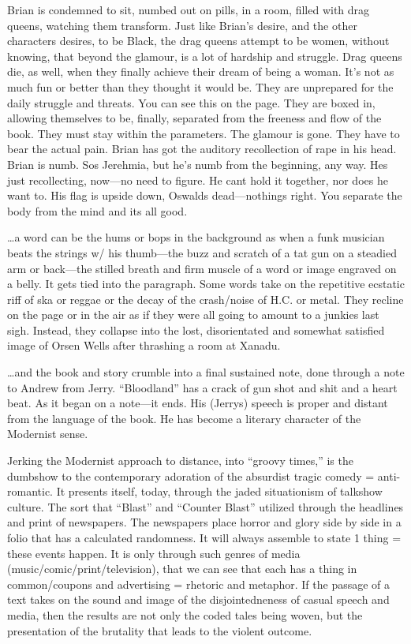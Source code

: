 \documentclass[
]{memoir}
\begin{document}
Brian is condemned to sit, numbed out on pills, in a room, filled with
drag queens, watching them transform. Just like Brian's desire, and the
other characters desires, to be Black, the drag queens attempt to be
women, without knowing, that beyond the glamour, is a lot of hardship
and struggle. Drag queens die, as well, when they finally achieve their
dream of being a woman. It's not as much fun or better than they thought
it would be. They are unprepared for the daily struggle and threats. You
can see this on the page. They are boxed in, allowing themselves to be,
finally, separated from the freeness and flow of the book. They must
stay within the parameters. The glamour is gone. They have to bear the
actual pain. Brian has got the auditory recollection of rape in his
head. Brian is numb. Sos Jerehmia, but he's numb from the beginning, any
way. Hes just recollecting, now---no need to figure. He cant hold it
together, nor does he want to. His flag is upside down, Oswalds
dead---nothings right. You separate the body from the mind and its all
good.

\ldots{}a word can be the hums or bops in the background as when a funk
musician beats the strings w/ his thumb---the buzz and scratch of a tat
gun on a steadied arm or back---the stilled breath and firm muscle of a
word or image engraved on a belly. It gets tied into the paragraph. Some
words take on the repetitive ecstatic riff of ska or reggae or the decay
of the crash/noise of H.C. or metal. They recline on the page or in the
air as if they were all going to amount to a junkies last sigh. Instead,
they collapse into the lost, disorientated and somewhat satisfied image
of Orsen Wells after thrashing a room at Xanadu.

\ldots{}and the book and story crumble into a final sustained note, done
through a note to Andrew from Jerry. ``Bloodland'' has a crack of gun
shot and shit and a heart beat. As it began on a note---it ends. His
(Jerrys) speech is proper and distant from the language of the book. He
has become a literary character of the Modernist sense.

Jerking the Modernist approach to distance, into ``groovy times,'' is
the dumbshow to the contemporary adoration of the absurdist tragic
comedy = anti-romantic. It presents itself, today, through the jaded
situationism of talkshow culture. The sort that ``Blast'' and ``Counter
Blast'' utilized through the headlines and print of newspapers. The
newspapers place horror and glory side by side in a folio that has a
calculated randomness. It will always assemble to state 1 thing = these
events happen. It is only through such genres of media
(music/comic/print/television), that we can see that each has a thing in
common/coupons and advertising = rhetoric and metaphor. If the passage
of a text takes on the sound and image of the disjointedneness of casual
speech and media, then the results are not only the coded tales being
woven, but the presentation of the brutality that leads to the violent
outcome.
\end{document}
